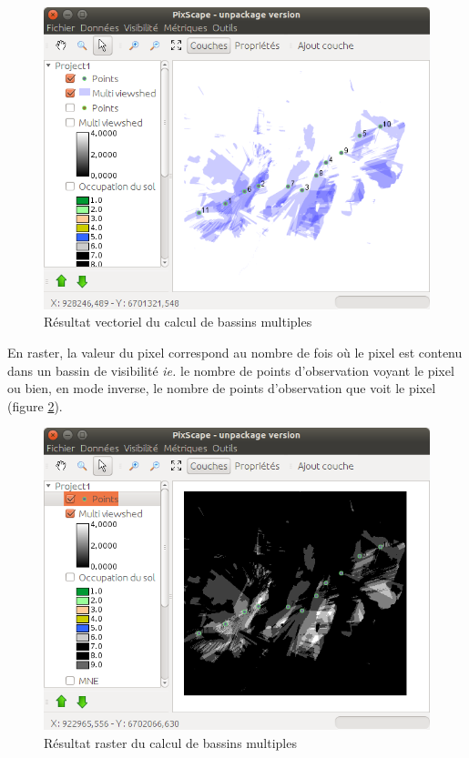 \documentclass{report}
\begin{document}
\begin{figure}[H]
	\includegraphics[scale=0.5]{img/multi_viewshed_vector-fr.png} 
	\caption{Résultat vectoriel du calcul de bassins multiples}
	\label{multi_viewshed_vector}
\end{figure}

En raster, la valeur du pixel correspond au nombre de fois où le pixel est contenu dans un bassin de visibilité \textit{ie.} le nombre de points d'observation voyant le pixel ou bien, en mode inverse, le nombre de points d'observation que voit le pixel (figure \ref{multi_viewshed_raster}).

\begin{figure}[H]
	\includegraphics[scale=0.5]{img/multi_viewshed_raster-fr.png} 
	\caption{Résultat raster du calcul de bassins multiples}
	\label{multi_viewshed_raster}
\end{figure}
\end{document}
